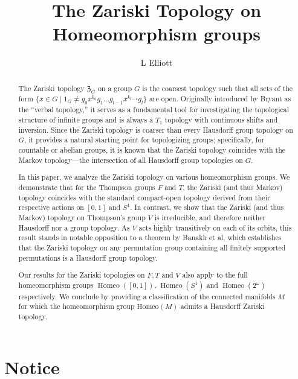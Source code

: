 \documentclass[11pt]{amsart}
\author{L Elliott}
\title{The Zariski Topology on Homeomorphism groups}
\begin{document}
\maketitle

\begin{abstract}
    The Zariski topology $\mathfrak{Z}_G$ on a group $G$ is the coarsest topology such that all sets of the form $\{x \in G \mid 1_G \neq g_0 x^{k_0} g_1 \dots g_{l-1} x^{k_{l-1}} g_l\}$ are open. Originally introduced by Bryant as the ``verbal topology,'' it serves as a fundamental tool for investigating the topological structure of infinite groups and is always a \(T_1\) topology with continuous shifts and inversion.
    Since the Zariski topology is coarser than every Hausdorff group topology on $G$, it provides a natural starting point for topologizing groups; specifically, for countable or abelian groups, it is known that the Zariski topology coincides with the Markov topology—the intersection of all Hausdorff group topologies on $G$. 

    In this paper, we analyze the Zariski topology on various homeomorphism groups. We demonstrate that for the Thompson groups $F$ and $T$, the Zariski (and thus Markov) topology coincides with the standard compact-open topology derived from their respective actions on $[0,1]$ and $S^1$. In contrast, we show that the Zariski (and thus Markov) topology on Thompson's group $V$ is irreducible, and therefore neither Hausdorff nor a group topology. As $V$ acts highly transitively on each of its orbits, this result stands in notable opposition to a theorem by Banakh et al, which establishes that the Zariski topology on any permutation group containing all finitely supported permutations is a Hausdorff group topology.

    Our results for the Zariski topologies on \(F,T\) and \(V\) also apply to the full homeomorphism groups $\operatorname{Homeo}([0,1])$, $\operatorname{Homeo}(S^1)$ and $\operatorname{Homeo}(2^\omega)$ respectively. We conclude by providing a classification of the connected manifolds $M$ for which the homeomorphism group $\mathrm{Homeo}(M)$ admits a Hausdorff Zariski topology.
\end{abstract}
\tableofcontents
\section{Notice}
\end{document}

